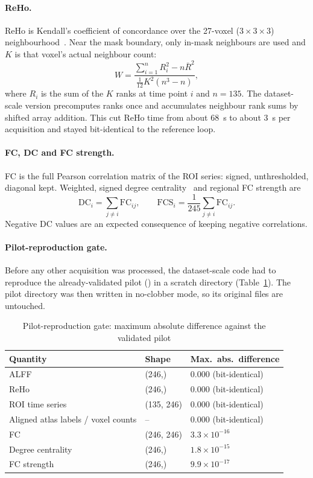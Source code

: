 \documentclass{ssnreview}
\newcommand{\hdr}{\rowcolor{SSNBlue!12}}                      %
\begin{document}
\paragraph{ReHo.} ReHo is Kendall's coefficient of concordance over the
27-voxel ($3\times3\times3$) neighbourhood~\cite{zang2004}. Near the mask
boundary, only in-mask neighbours are used and $K$ is that voxel's actual
neighbour count:
\begin{equation}
  W = \frac{\sum_{i=1}^{n} R_i^2 - n\bar{R}^2}{\tfrac{1}{12}K^2(n^3-n)},
\end{equation}
where $R_i$ is the sum of the $K$ ranks at time point $i$ and $n=135$. The
dataset-scale version precomputes ranks once and accumulates neighbour rank
sums by shifted array addition. This cut ReHo time from about 68~s to about 3~s
per acquisition and stayed bit-identical to the reference loop.

\paragraph{FC, DC and FC strength.} FC is the full Pearson correlation matrix
of the ROI series: signed, unthresholded, diagonal kept. Weighted, signed degree
centrality~\cite{zuo2012} and regional FC strength are
\begin{equation}
  \text{DC}_i = \sum_{j\ne i}\text{FC}_{ij},\qquad
  \text{FCS}_i = \frac{1}{245}\sum_{j\ne i}\text{FC}_{ij}.
\end{equation}
Negative DC values are an expected consequence of keeping negative
correlations.

\paragraph{Pilot-reproduction gate.} Before any other acquisition was
processed, the dataset-scale code had to reproduce the already-validated pilot
() in a scratch directory
(Table~\ref{tab:pilot}). The pilot directory was then written in no-clobber
mode, so its original files are untouched.

\begin{table}[H]
\centering
\caption{Pilot-reproduction gate: maximum absolute difference against the
validated pilot}\label{tab:pilot}
\begin{tabular}{lll}
\toprule
\hdr Quantity & Shape & Max.\ abs.\ difference\\
\midrule
ALFF                 & (246,)      & 0.000 (bit-identical)\\
ReHo                 & (246,)      & 0.000 (bit-identical)\\
ROI time series      & (135, 246)  & 0.000 (bit-identical)\\
Aligned atlas labels / voxel counts & -- & 0.000 (bit-identical)\\
FC                   & (246, 246)  & $3.3\times10^{-16}$\\
Degree centrality    & (246,)      & $1.8\times10^{-15}$\\
FC strength          & (246,)      & $9.9\times10^{-17}$\\
\bottomrule
\end{tabular}
\end{table}
\end{document}
